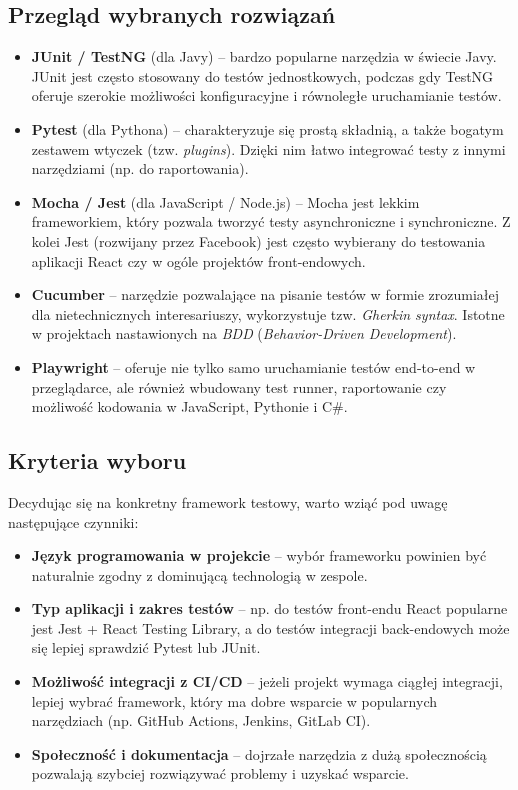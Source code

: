 \documentclass[12pt]{report}
\begin{document}
\subsection*{Przegląd wybranych rozwiązań}
\begin{itemize}
    \item \textbf{JUnit / TestNG} (dla Javy) -- bardzo popularne narzędzia w świecie Javy. JUnit jest często stosowany do testów jednostkowych, podczas gdy TestNG oferuje szerokie możliwości konfiguracyjne i równoległe uruchamianie testów.
    \item \textbf{Pytest} (dla Pythona) -- charakteryzuje się prostą składnią, a także bogatym zestawem wtyczek (tzw. \emph{plugins}). Dzięki nim łatwo integrować testy z innymi narzędziami (np. do raportowania).
    \item \textbf{Mocha / Jest} (dla JavaScript / Node.js) -- Mocha jest lekkim frameworkiem, który pozwala tworzyć testy asynchroniczne i synchroniczne. Z kolei Jest (rozwijany przez Facebook) jest często wybierany do testowania aplikacji React czy w ogóle projektów front-endowych.
    \item \textbf{Cucumber} -- narzędzie pozwalające na pisanie testów w formie zrozumiałej dla nietechnicznych interesariuszy, wykorzystuje tzw. \emph{Gherkin syntax}. Istotne w projektach nastawionych na \emph{BDD} (\emph{Behavior-Driven Development}).
    \item \textbf{Playwright} -- oferuje nie tylko samo uruchamianie testów end-to-end w przeglądarce, ale również wbudowany test runner, raportowanie czy możliwość kodowania w JavaScript, Pythonie i C#.
\end{itemize}

\subsection*{Kryteria wyboru}
Decydując się na konkretny framework testowy, warto wziąć pod uwagę następujące czynniki:
\begin{itemize}
    \item \textbf{Język programowania w projekcie} -- wybór frameworku powinien być naturalnie zgodny z dominującą technologią w zespole.
    \item \textbf{Typ aplikacji i zakres testów} -- np. do testów front-endu React popularne jest Jest + React Testing Library, a do testów integracji back-endowych może się lepiej sprawdzić Pytest lub JUnit.
    \item \textbf{Możliwość integracji z CI/CD} -- jeżeli projekt wymaga ciągłej integracji, lepiej wybrać framework, który ma dobre wsparcie w popularnych narzędziach (np. GitHub Actions, Jenkins, GitLab CI).
    \item \textbf{Społeczność i dokumentacja} -- dojrzałe narzędzia z dużą społecznością pozwalają szybciej rozwiązywać problemy i uzyskać wsparcie.
\end{itemize}
\end{document}

